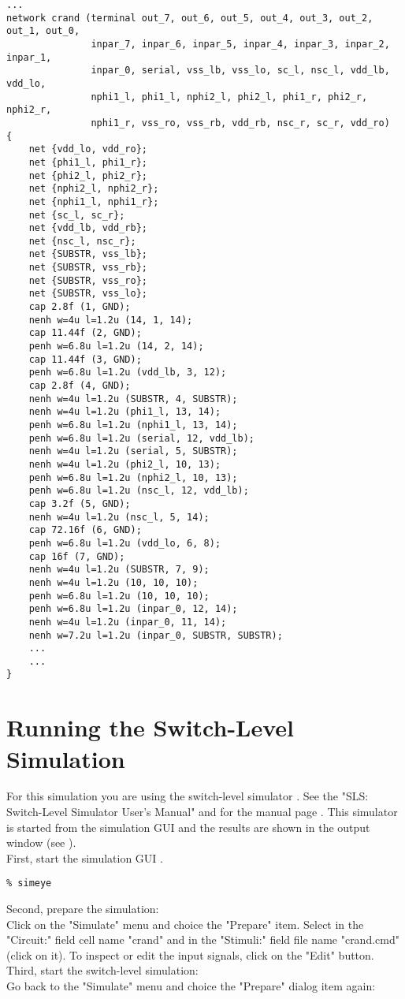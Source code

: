 \small \begin{Verbatim}[frame=single]
   ...
network crand (terminal out_7, out_6, out_5, out_4, out_3, out_2, out_1, out_0,
               inpar_7, inpar_6, inpar_5, inpar_4, inpar_3, inpar_2, inpar_1,
               inpar_0, serial, vss_lb, vss_lo, sc_l, nsc_l, vdd_lb, vdd_lo,
               nphi1_l, phi1_l, nphi2_l, phi2_l, phi1_r, phi2_r, nphi2_r,
               nphi1_r, vss_ro, vss_rb, vdd_rb, nsc_r, sc_r, vdd_ro)
{
    net {vdd_lo, vdd_ro};
    net {phi1_l, phi1_r};
    net {phi2_l, phi2_r};
    net {nphi2_l, nphi2_r};
    net {nphi1_l, nphi1_r};
    net {sc_l, sc_r};
    net {vdd_lb, vdd_rb};
    net {nsc_l, nsc_r};
    net {SUBSTR, vss_lb};
    net {SUBSTR, vss_rb};
    net {SUBSTR, vss_ro};
    net {SUBSTR, vss_lo};
    cap 2.8f (1, GND);
    nenh w=4u l=1.2u (14, 1, 14);
    cap 11.44f (2, GND);
    penh w=6.8u l=1.2u (14, 2, 14);
    cap 11.44f (3, GND);
    penh w=6.8u l=1.2u (vdd_lb, 3, 12);
    cap 2.8f (4, GND);
    nenh w=4u l=1.2u (SUBSTR, 4, SUBSTR);
    nenh w=4u l=1.2u (phi1_l, 13, 14);
    penh w=6.8u l=1.2u (nphi1_l, 13, 14);
    penh w=6.8u l=1.2u (serial, 12, vdd_lb);
    nenh w=4u l=1.2u (serial, 5, SUBSTR);
    nenh w=4u l=1.2u (phi2_l, 10, 13);
    penh w=6.8u l=1.2u (nphi2_l, 10, 13);
    penh w=6.8u l=1.2u (nsc_l, 12, vdd_lb);
    cap 3.2f (5, GND);
    nenh w=4u l=1.2u (nsc_l, 5, 14);
    cap 72.16f (6, GND);
    penh w=6.8u l=1.2u (vdd_lo, 6, 8);
    cap 16f (7, GND);
    nenh w=4u l=1.2u (SUBSTR, 7, 9);
    nenh w=4u l=1.2u (10, 10, 10);
    penh w=6.8u l=1.2u (10, 10, 10);
    penh w=6.8u l=1.2u (inpar_0, 12, 14);
    nenh w=4u l=1.2u (inpar_0, 11, 14);
    nenh w=7.2u l=1.2u (inpar_0, SUBSTR, SUBSTR);
    ...
    ...
}
\end{Verbatim}
\normalsize

\section{Running the Switch-Level Simulation}
For this simulation you are using the switch-level simulator .
See the "SLS: Switch-Level Simulator User's Manual" and for the manual page .
This simulator is started from the simulation GUI  and
the results are shown in the output window (see ).
\\[1 ex]
First, start the simulation GUI .
\small
\begin{Verbatim}
% simeye
\end{Verbatim}
\normalsize
Second, prepare the simulation:
\\[1 ex]
Click on the "Simulate" menu and choice the "Prepare" item.
Select in the "Circuit:" field cell name "crand" and
in the "Stimuli:" field file name "crand.cmd" (click on it).
To inspect or edit the input signals, click on the "Edit" button.
\\[1 ex]
Third, start the switch-level simulation:
\\[1 ex]
Go back to the "Simulate" menu and choice the "Prepare" dialog item again:


